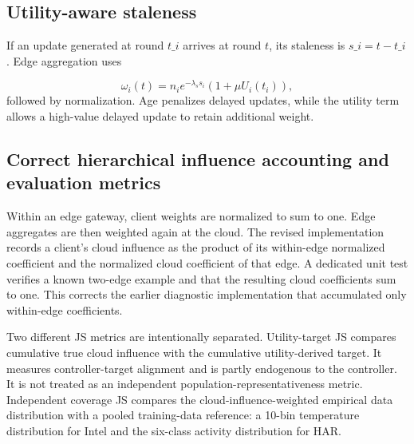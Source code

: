 \documentclass[11pt]{article}
\begin{document}
\subsection*{Utility-aware staleness}
If an update generated at round \(t\_i\) arrives at round \(t\), its staleness is \(s\_i=t-t\_i\). Edge aggregation uses\par
\[
\omega_i(t)=n_i e^{-\lambda_s s_i}\left(1+\mu U_i(t_i)\right),
\]
followed by normalization. Age penalizes delayed updates, while the utility term allows a high-value delayed update to retain additional weight.\par
\subsection*{Correct hierarchical influence accounting and evaluation metrics}
Within an edge gateway, client weights are normalized to sum to one. Edge aggregates are then weighted again at the cloud. The revised implementation records a client's cloud influence as the product of its within-edge normalized coefficient and the normalized cloud coefficient of that edge. A dedicated unit test verifies a known two-edge example and that the resulting cloud coefficients sum to one. This corrects the earlier diagnostic implementation that accumulated only within-edge coefficients.\par
Two different JS metrics are intentionally separated. Utility-target JS compares cumulative true cloud influence with the cumulative utility-derived target. It measures controller-target alignment and is partly endogenous to the controller. It is not treated as an independent population-representativeness metric. Independent coverage JS compares the cloud-influence-weighted empirical data distribution with a pooled training-data reference: a 10-bin temperature distribution for Intel and the six-class activity distribution for HAR.\par
\end{document}
